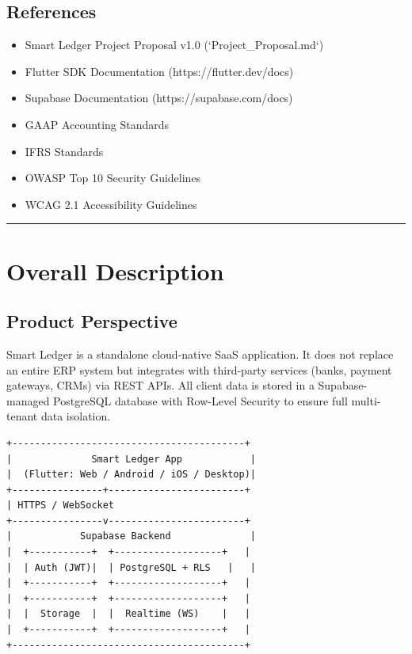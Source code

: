 \documentclass[journal, a4paper, onecolumn, 12pt]{IEEEtran}
\begin{document}
\subsection{References}
\begin{itemize}[leftmargin=*]
\item Smart Ledger Project Proposal v1.0 (`Project\_Proposal.md`)
\item Flutter SDK Documentation (https://flutter.dev/docs)
\item Supabase Documentation (https://supabase.com/docs)
\item GAAP Accounting Standards
\item IFRS Standards
\item OWASP Top 10 Security Guidelines
\item WCAG 2.1 Accessibility Guidelines
\end{itemize}

\vspace{1em}\hrule\vspace{1em}

\section{Overall Description}

\subsection{Product Perspective}
Smart Ledger is a standalone cloud-native SaaS application. It does not replace an entire ERP system but integrates with third-party services (banks, payment gateways, CRMs) via REST APIs. All client data is stored in a Supabase-managed PostgreSQL database with Row-Level Security to ensure full multi-tenant data isolation.

\begin{verbatim}
+-----------------------------------------+
|              Smart Ledger App            |
|  (Flutter: Web / Android / iOS / Desktop)|
+----------------+------------------------+
| HTTPS / WebSocket
+----------------v------------------------+
|            Supabase Backend              |
|  +-----------+  +-------------------+   |
|  | Auth (JWT)|  | PostgreSQL + RLS   |   |
|  +-----------+  +-------------------+   |
|  +-----------+  +-------------------+   |
|  |  Storage  |  |  Realtime (WS)    |   |
|  +-----------+  +-------------------+   |
+-----------------------------------------+
\end{verbatim}
\end{document}
